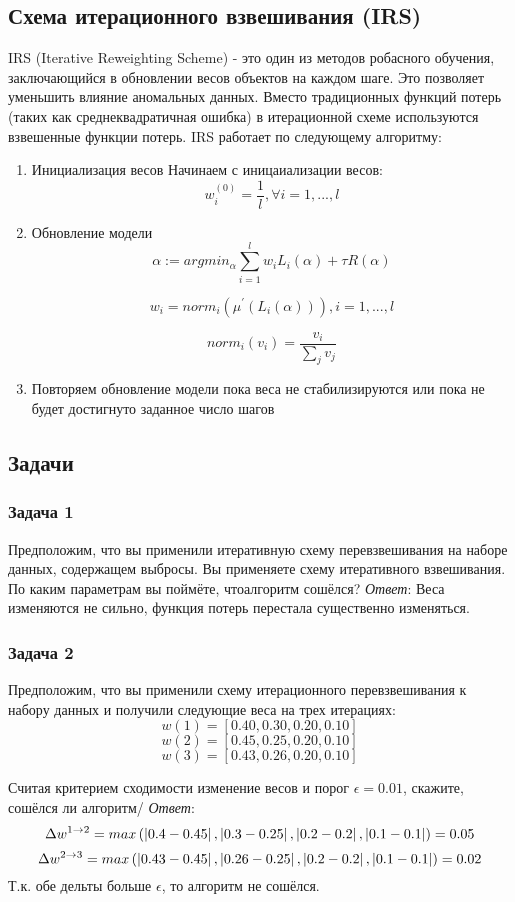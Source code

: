 \subsection{Схема итерационного взвешивания (IRS)}
IRS (Iterative Reweighting Scheme) - это один из
методов робасного обучения, заключающийся в обновлении весов объектов на каждом
шаге. Это позволяет уменьшить влияние аномальных данных. Вместо традиционных
функций потерь (таких как среднеквадратичная ошибка) в итерационной схеме
используются взвешенные функции потерь. IRS работает по следующему алгоритму:

\begin{enumerate}
  \item Инициализация весов
    Начинаем с иницаиализации весов:
    \[w_i^{(0)} = \frac{1}{l}, \forall i = 1, ..., l\]
  \item Обновление модели
    \[\alpha := arg min_{\alpha} \sum_{i=1}^l w_i L_i\left(\alpha\right) + \tau R\left(\alpha\right)\]

    \[w_i = norm_i\left( \mu^{'}\left( L_i(\alpha) \right) \right), i = 1, ..., l\]

    \[norm_i(v_i) = \frac{v_i}{\sum_j v_j}\]
  \item Повторяем обновление модели пока веса не стабилизируются или пока не
    будет достигнуто заданное число шагов
\end{enumerate}

\subsection{Задачи}
\subsubsection{Задача 1}
Предположим, что вы применили итеративную схему перевзвешивания на наборе
данных, содержащем выбросы. Вы применяете схему итеративного взвешивания.
По каким параметрам вы поймёте, чтоалгоритм сошёлся?
\textit{Ответ}: Веса изменяются не сильно, функция потерь перестала существенно
изменяться.
\subsubsection{Задача 2}
Предположим, что вы применили схему итерационного перевзвешивания к набору
данных и получили следующие веса на трех итерациях:
\[ w(1) = [0.40, 0.30, 0.20, 0.10] \]
\[ w(2) = [0.45, 0.25, 0.20 ,0.10] \]
\[ w(3) = [0.43, 0.26, 0.20, 0.10] \]

Считая критерием сходимости изменение весов и порог \(\epsilon = 0.01\),
скажите, сошёлся ли алгоритм/
\textit{Ответ}:
\[ \Delta w^{1\rightarrow2} = max\left( \left|0.4-0.45\right|, \left|0.3 - 0.25\right|, \left|0.2-0.2\right|, \left|0.1-0.1\right|  \right) = 0.05 \]
\[ \Delta w^{2\rightarrow3} = max\left( \left|0.43-0.45\right|, \left|0.26 - 0.25\right|, \left|0.2-0.2\right|, \left|0.1-0.1\right|  \right) = 0.02 \]
Т.к. обе дельты больше \(\epsilon\), то алгоритм не сошёлся.

